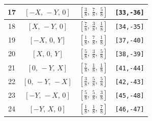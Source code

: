 \documentclass[fleqn,8pt]{jsarticle}
\begin{document}
\begin{longtable}{cccc}
17 & $\left[ - X,\, - Y,\, 0 \right]$ & $\left[ \frac{3}{8},\, \frac{7}{8},\, \frac{5}{8} \right]$ & {\tt [33,-36]} \\ \hline
18 & $\left[ X,\, - Y,\, 0 \right]$ & $\left[ \frac{7}{8},\, \frac{3}{8},\, \frac{1}{8} \right]$ & {\tt [34,-35]} \\ \hline
19 & $\left[ - X,\, 0,\, Y \right]$ & $\left[ \frac{1}{8},\, \frac{7}{8},\, \frac{1}{8} \right]$ & {\tt [37,-40]} \\ \hline
20 & $\left[ X,\, 0,\, Y \right]$ & $\left[ \frac{5}{8},\, \frac{3}{8},\, \frac{5}{8} \right]$ & {\tt [38,-39]} \\ \hline
21 & $\left[ 0,\, - Y,\, X \right]$ & $\left[ \frac{7}{8},\, \frac{1}{8},\, \frac{1}{8} \right]$ & {\tt [41,-44]} \\ \hline
22 & $\left[ 0,\, - Y,\, - X \right]$ & $\left[ \frac{3}{8},\, \frac{5}{8},\, \frac{5}{8} \right]$ & {\tt [42,-43]} \\ \hline
23 & $\left[ - Y,\, - X,\, 0 \right]$ & $\left[ \frac{5}{8},\, \frac{5}{8},\, \frac{3}{8} \right]$ & {\tt [45,-48]} \\ \hline
24 & $\left[ - Y,\, X,\, 0 \right]$ & $\left[ \frac{1}{8},\, \frac{1}{8},\, \frac{7}{8} \right]$ & {\tt [46,-47]} \\
\end{longtable}
\renewcommand{\arraystretch}{1.2}
\end{document}
